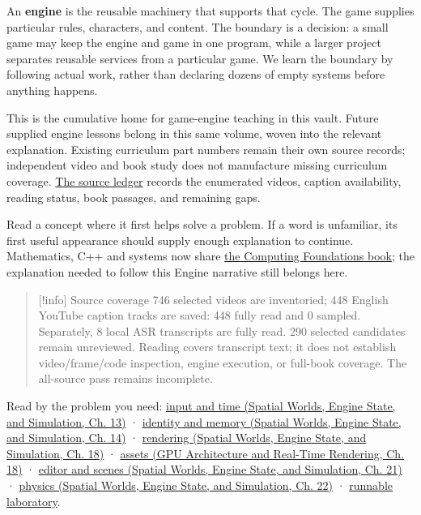 An \textbf{engine} is the reusable machinery that supports that cycle. The game supplies particular rules, characters, and content. The boundary is a decision: a small game may keep the engine and game in one program, while a larger project separates reusable services from a particular game. We learn the boundary by following actual work, rather than declaring dozens of empty systems before anything happens.

This is the cumulative home for game-engine teaching in this vault. Future supplied engine lessons belong in this same volume, woven into the relevant explanation. Existing curriculum part numbers remain their own source records; independent video and book study does not manufacture missing curriculum coverage. \hyperref[appendix-877738f6f4d2]{The source ledger} records the enumerated videos, caption availability, reading status, book passages, and remaining gaps.

Read a concept where it first helps solve a problem. If a word is unfamiliar, its first useful appearance should supply enough explanation to continue. Mathematics, C++ and systems now share \hyperref[volume-reading-map]{the Computing Foundations book}; the explanation needed to follow this Engine narrative still belongs here.

\begin{quote}
{[}!info{]} Source coverage 746 selected videos are inventoried; 448 English YouTube caption tracks are saved: 448 fully read and 0 sampled. Separately, 8 local ASR transcripts are fully read. 290 selected candidates remain unreviewed. Reading covers transcript text; it does not establish video/frame/code inspection, engine execution, or full-book coverage. The all-source pass remains incomplete.
\end{quote}

Read by the problem you need: \href{../05-Spatial-Worlds-Engine-State-and-Simulation/main.pdf\#nameddest=05-engine-i-ch013-let-one-input-produce-one-intended-change}{input and time (Spatial Worlds, Engine State, and Simulation, Ch. 13)} · \href{../05-Spatial-Worlds-Engine-State-and-Simulation/main.pdf\#nameddest=05-engine-i-ch014-keep-identity-storage-and-ownership-in-agreement}{identity and memory (Spatial Worlds, Engine State, and Simulation, Ch. 14)} · \href{../05-Spatial-Worlds-Engine-State-and-Simulation/main.pdf\#nameddest=05-engine-i-ch018-give-the-renderer-a-clear-job-then-meet-the-graphics-api}{rendering (Spatial Worlds, Engine State, and Simulation, Ch. 18)} · \href{../06-GPU-Architecture-and-Real-Time-Rendering/main.pdf\#nameddest=06-engine-ii-ch027-prepare-and-publish-content-before-promising-it-is-ready}{assets (GPU Architecture and Real-Time Rendering, Ch. 18)} · \href{../05-Spatial-Worlds-Engine-State-and-Simulation/main.pdf\#nameddest=06-engine-ii-ch031-make-a-world-that-can-be-authored-saved-and-run}{editor and scenes (Spatial Worlds, Engine State, and Simulation, Ch. 21)} · \href{../05-Spatial-Worlds-Engine-State-and-Simulation/main.pdf\#nameddest=06-engine-ii-ch033-let-motion-and-contact-answer-the-same-world-rules}{physics (Spatial Worlds, Engine State, and Simulation, Ch. 22)} · \hyperref[06-engine-ii-ch042-reconstruct-the-working-loop-and-test-its-contracts]{runnable laboratory}.

